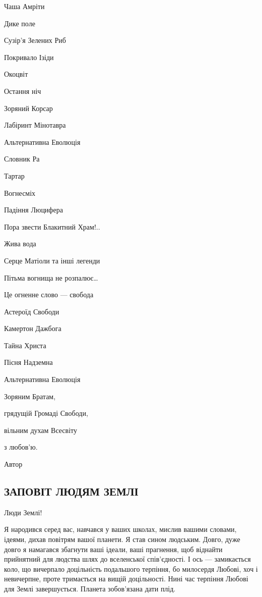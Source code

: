 Чаша Амріти

Дике поле

Сузір’я Зелених Риб

Покривало Ізіди

Окоцвіт

Остання ніч

Зоряний Корсар

Лабіринт Мінотавра

Альтернативна Еволюція

Словник Ра

Тартар

Вогнесміх

Падіння Люцифера

Пора звести Блакитний Храм!..

Жива вода

Серце Матіоли та інші легенди

Пітьма вогнища не розпалює…

Це огненне слово — свобода

Астероїд Свободи

Камертон Дажбога

Тайна Христа

Пісня Надземна

Альтернативна Еволюція

Зоряним Братам,

грядущій Громаді Свободи,

вільним духам Всесвіту

з любов’ю.

Автор



\subsection{ЗАПОВІТ ЛЮДЯМ ЗЕМЛІ}

Люди Землі!

Я народився серед вас, навчався у ваших школах, мислив вашими словами, ідеями,
дихав повітрям вашої планети. Я став сином людським. Довго, дуже довго я
намагався збагнути ваші ідеали, ваші прагнення, щоб віднайти прийнятний для
людства шлях до вселенської спів’єдності. І ось — замикається коло, що
вичерпало доцільність подальшого терпіння, бо милосердя Любові, хоч і
невичерпне, проте тримається на вищій доцільності. Нині час терпіння Любові для
Землі завершується. Планета зобов’язана дати плід.

